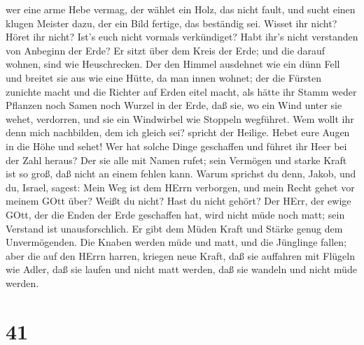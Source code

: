 wer eine arme Hebe vermag, der wählet ein Holz, das nicht fault, und
sucht einen klugen Meister dazu, der ein Bild fertige, das beständig
sei.  Wisset ihr nicht? Höret ihr nicht? Ist's euch nicht
vormals verkündiget? Habt ihr's nicht verstanden von Anbeginn der Erde?
 Er sitzt über dem Kreis der Erde; und die darauf wohnen,
sind wie Heuschrecken. Der den Himmel ausdehnet wie ein dünn Fell und
breitet sie aus wie eine Hütte, da man innen wohnet;  der
die Fürsten zunichte macht und die Richter auf Erden eitel macht,
 als hätte ihr Stamm weder Pflanzen noch Samen noch Wurzel
in der Erde, daß sie, wo ein Wind unter sie wehet, verdorren, und sie
ein Windwirbel wie Stoppeln wegführet.  Wem wollt ihr denn
mich nachbilden, dem ich gleich sei? spricht der Heilige. 
Hebet eure Augen in die Höhe und sehet! Wer hat solche Dinge geschaffen
und führet ihr Heer bei der Zahl heraus? Der sie alle mit Namen rufet;
sein Vermögen und starke Kraft ist so groß, daß nicht an einem fehlen
kann.  Warum sprichst du denn, Jakob, und du, Israel,
sagest: Mein Weg ist dem HErrn verborgen, und mein Recht gehet vor
meinem GOtt über?  Weißt du nicht? Hast du nicht gehört?
Der HErr, der ewige GOtt, der die Enden der Erde geschaffen hat, wird
nicht müde noch matt; sein Verstand ist unausforschlich. 
Er gibt dem Müden Kraft und Stärke genug dem Unvermögenden.
 Die Knaben werden müde und matt, und die Jünglinge fallen;
 aber die auf den HErrn harren, kriegen neue Kraft, daß sie
auffahren mit Flügeln wie Adler, daß sie laufen und nicht matt werden,
daß sie wandeln und nicht müde werden.

\hypertarget{section-40}{%
\section{41}\label{section-40}}

